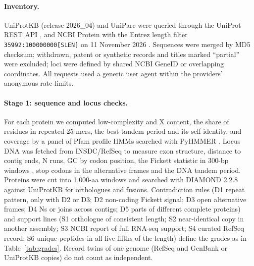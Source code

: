 \documentclass[11pt]{article}
\begin{document}
\paragraph{Inventory.} UniProtKB (release 2026\_04) and UniParc were queried through the UniProt REST API
\citep{uniprot2025}, and NCBI Protein with the Entrez length filter \texttt{35992:100000000[SLEN]} on 11 November 2026
\citep{sayers2026,oleary2016}. Sequences were merged by MD5 checksum; withdrawn, patent or synthetic records and titles
marked ``partial'' were excluded; loci were defined by shared NCBI GeneID or overlapping coordinates. All requests used a
generic user agent within the providers' anonymous rate limits.

\paragraph{Stage 1: sequence and locus checks.} For each protein we computed low-complexity and X content, the share of
residues in repeated 25-mers, the best tandem period and its self-identity, and coverage by a panel of 
Pfam profile HMMs \citep{mistry2021} searched with PyHMMER \citep{eddy2011,larralde2023}. Locus DNA was fetched from
INSDC/RefSeq to measure exon structure, distance to contig ends, N runs, GC by codon position, the Fickett statistic in
300-bp windows \citep{fickett1982}, stop codons in the alternative frames and the DNA tandem period. Proteins were cut into
1,000-aa windows and searched with DIAMOND 2.2.8 \citep{buchfink2021} against UniProtKB for orthologues and fusions.
Contradiction rules (D1 repeat pattern, only with D2 or D3; D2 non-coding Fickett signal; D3 open alternative frames;
D4 Ns or joins across contigs; D5 parts of different complete proteins) and support lines (S1 orthologue of consistent
length; S2 near-identical copy in another assembly; S3 NCBI report of full RNA-seq support; S4 curated RefSeq record;
S6 unique peptides in all five fifths of the length) define the grades as in Table~\ref{tab:grades}. Record twins of one
genome (RefSeq and GenBank or UniProtKB copies) do not count as independent.
\end{document}
